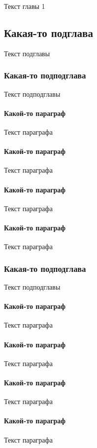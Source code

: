 Текст главы 1
\subsection{Какая-то подглава}
    Текст подглавы
    \subsubsection{Какая-то подподглава}
        Текст подподглавы
        \paragraph{Какой-то параграф}
            Текст  параграфа
        \paragraph{Какой-то параграф}
            Текст  параграфа
        \paragraph{Какой-то параграф}
            Текст  параграфа
        \paragraph{Какой-то параграф}
            Текст  параграфа
    \subsubsection{Какая-то подподглава}
        Текст подподглавы
        \paragraph{Какой-то параграф}
            Текст  параграфа
        \paragraph{Какой-то параграф}
            Текст  параграфа
        \paragraph{Какой-то параграф}
            Текст  параграфа
        \paragraph{Какой-то параграф}
            Текст  параграфа